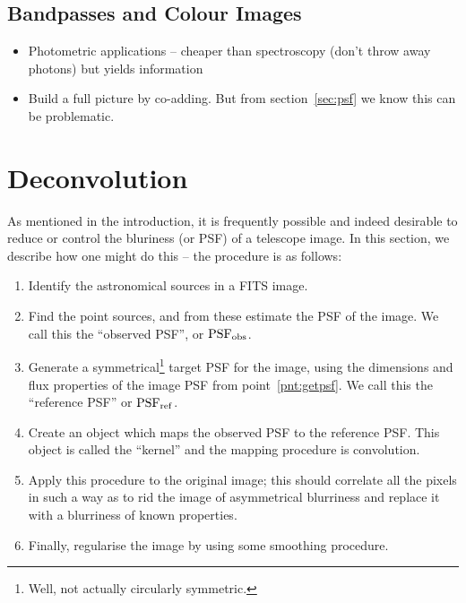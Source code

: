 \documentclass[letterpaper, 11pt]{article}
\def\psfobs{\ensuremath{{\rm PSF_{obs}}}\xspace}
\def\psfref{\ensuremath{{\rm PSF_{ref}}}\xspace}
\def\MORE{{\color{red}{\bf MORE}}\xspace}
\begin{document}
\subsection{Bandpasses and Colour Images}
\label{sec:bands}

\begin{itemize}
	\item Photometric applications -- cheaper than spectroscopy (don't throw away photons) but yields information
	\item Build a full picture by co-adding. But from section~\ref{sec:psf} we know this can be problematic.
\end{itemize}

\newpage
\section{Deconvolution}
\label{sec:deconvolution}

As mentioned in the introduction, it is frequently possible and indeed desirable to reduce or control the bluriness (or PSF) of a telescope image. In this section, we describe how one might do this -- the procedure is as follows:

\begin{enumerate}
	\item Identify the astronomical sources in a FITS image.
	\item Find the point sources, and from these estimate the PSF of the image. We call this the ``observed PSF'', or \psfobs.\label{pnt:getpsf}
	\item Generate a symmetrical\footnote{Well, not actually circularly symmetric.} target PSF for the image, using the dimensions and flux properties of the image PSF from point~\ref{pnt:getpsf}. We call this the ``reference PSF'' or \psfref.\label{pnt:PSF0}
	\item Create an object which maps the observed PSF to the reference PSF. This object is called the ``kernel'' and the mapping procedure is convolution.
	\item Apply this procedure to the original image; this should correlate all the pixels in such a way as to rid the image of asymmetrical blurriness and replace it with a blurriness of known properties.
	\item Finally, regularise the image by using some smoothing procedure.\MORE
\end{enumerate}
\end{document}
